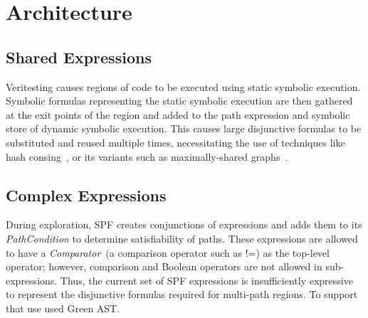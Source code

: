 \section{Architecture}

\subsection{Shared Expressions}
%
Veritesting causes regions of code to be executed using static symbolic execution.
%
Symbolic formulas representing the static symbolic execution are then gathered at the exit points of the region and added to the path expression and symbolic store of dynamic symbolic execution.
%
This causes large disjunctive formulas to be substituted and reused
multiple times, necessitating the use of techniques like hash
consing~\cite{hashconsing}, or its variants such as maximally-shared
graphs~\cite{babic}.%

\subsection{Complex Expressions}
During exploration, SPF creates conjunctions of expressions and adds them to its {\em PathCondition} to determine satisfiability of paths.
%
These expressions are allowed to have a \textit{Comparator}~(a comparison operator such as !=) as the top-level operator; however, comparison and Boolean operators are not allowed in sub-expressions.  Thus, the current set of SPF expressions is insufficiently expressive to represent the disjunctive formulas required for multi-path regions. To support that use used Green\cite{green} AST.
